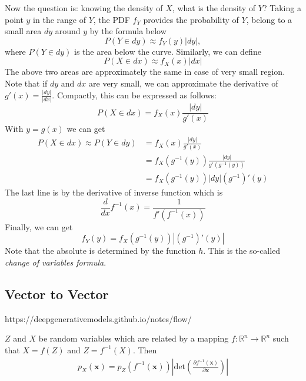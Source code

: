 Now the question is: knowing the density of $X$, what is the density of $Y$?
Taking a point $y$ in the range of $Y$, the PDF $f_Y$ provides the probability of $Y$, belong to a small area $dy$ around $y$ by the formula below
$$P(Y\in dy)\approx f_Y(y)|dy|,$$
where $P(Y\in dy)$ is the area below the curve. Similarly, we can define
$$P(X\in dx)\approx f_X(x)|dx|$$
The above two areas are approximately the same in case of very small region. Note that if $dy$ and $dx$ are very small, we can approximate the derivative of $g'(x)=\frac{|dy|}{|dx|}$. Compactly, this can be expressed as follows:
$$P(X\in dx) = f_X(x)\frac{|dy|}{g'(x)}$$
With $y=g(x)$ we can get 
\begin{align*}
	P(X\in dx)\approx P(Y\in dy) &= f_X(x)\frac{|dy|}{g'(x)}\\
	& = f_X(g^{-1}(y))\frac{|dy|}{g'(g^{-1}(y))}\\
	& = f_X(g^{-1}(y))|dy|(g^{-1})'(y)
\end{align*}
The last line is by the derivative of inverse function which is 
$$\frac{d}{dx}f^{-1}(x) = \frac{1}{f'(f^{-1}(x))}$$
Finally, we can get 
$$f_Y(y) = f_X(g^{-1}(y))|(g^{-1})'(y)|$$
Note that the absolute is determined by the function $h$. This is the so-called \textit{change of variables formula}.



\subsection{Vector to Vector}

https://deepgenerativemodels.github.io/notes/flow/

$Z$ and $X$ be random variables which are related by a mapping $f:\mathbb{R}^n\to \mathbb{R}^n$ such that $X=f(Z)$ and $Z=f^{-1}(X)$. Then
\begin{align*}
	p_X(\mathbf{x}) = p_Z(f^{-1}(\mathbf{x})) \left\vert \text{det}\left(\frac{\partial f^{-1}(\mathbf{x})}{\partial \mathbf{x}}\right) \right\vert
\end{align*}

